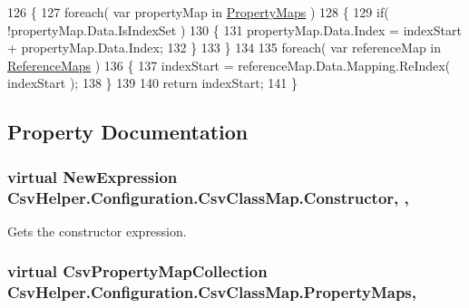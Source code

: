 \begin{DoxyCode}
126         \{
127             \textcolor{keywordflow}{foreach}( var propertyMap \textcolor{keywordflow}{in} \hyperlink{a00040_a9580e897abcba144f3101eb983348e25}{PropertyMaps} )
128             \{
129                 \textcolor{keywordflow}{if}( !propertyMap.Data.IsIndexSet )
130                 \{
131                     propertyMap.Data.Index = indexStart + propertyMap.Data.Index;
132                 \}
133             \}
134 
135             \textcolor{keywordflow}{foreach}( var referenceMap \textcolor{keywordflow}{in} \hyperlink{a00040_a6dfbf8f743b16d2ec83edef865ea2d9e}{ReferenceMaps} )
136             \{
137                 indexStart = referenceMap.Data.Mapping.ReIndex( indexStart );
138             \}
139 
140             \textcolor{keywordflow}{return} indexStart;
141         \}
\end{DoxyCode}


\subsection{Property Documentation}
\hypertarget{a00040_ae8038b36db7584ef1a73852fcc46404b}{
\subsubsection[{Constructor}]{\setlength{\rightskip}{0pt plus 5cm}virtual New\-Expression Csv\-Helper.\-Configuration.\-Csv\-Class\-Map.\-Constructor\hspace{0.3cm}{\ttfamily [get]}, {\ttfamily [set]}, {\ttfamily [inherited]}}}\label{a00040_ae8038b36db7584ef1a73852fcc46404b}


Gets the constructor expression. 

\hypertarget{a00040_a9580e897abcba144f3101eb983348e25}{
\subsubsection[{Property\-Maps}]{\setlength{\rightskip}{0pt plus 5cm}virtual {\bf Csv\-Property\-Map\-Collection} Csv\-Helper.\-Configuration.\-Csv\-Class\-Map.\-Property\-Maps\hspace{0.3cm}{\ttfamily [get]}, {\ttfamily [inherited]}}}\label{a00040_a9580e897abcba144f3101eb983348e25}


